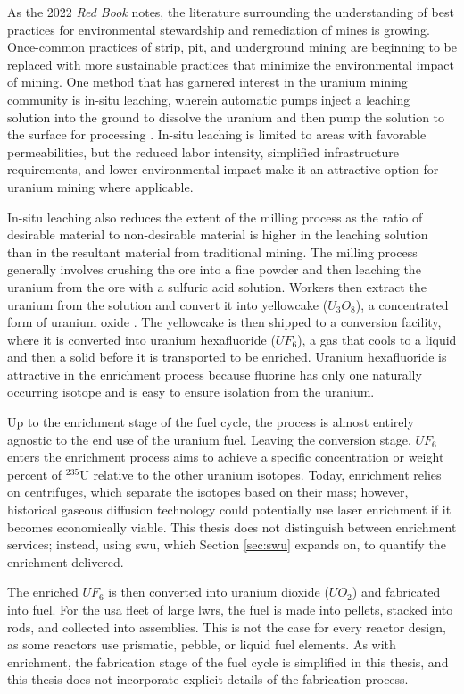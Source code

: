 As the 2022 \textit{Red Book} notes, the literature surrounding the understanding of best practices for environmental stewardship and remediation of mines is growing. Once-common practices of strip, pit, and underground
mining are beginning to be replaced with more sustainable practices that
minimize the environmental impact of mining. One method that has garnered
interest in the uranium mining community is in-situ leaching, wherein automatic pumps inject a leaching solution into the ground to dissolve the uranium and then pump the solution to the surface for processing \cite{insitu_review_2024}. In-situ leaching is limited to areas with favorable permeabilities, but the reduced labor intensity, simplified infrastructure requirements, and lower environmental impact make it an attractive option for uranium mining where applicable.

In-situ leaching also reduces the extent of the milling process as the ratio of
desirable material to non-desirable material is higher in the leaching solution
than in the resultant material from traditional mining. The milling process
generally involves crushing the ore into a fine powder and then leaching the
uranium from the ore with a sulfuric acid solution. Workers then extract the
uranium from the solution and convert it into yellowcake ($U_3O_8$), a
concentrated form of uranium oxide \cite{milling_uranium_2022}. The yellowcake
is then shipped to a conversion facility, where it is converted into uranium
hexafluoride ($UF_6$), a gas that cools to a liquid and then a solid before it
is transported to be enriched. Uranium hexafluoride is attractive in the
enrichment process because fluorine has only one naturally occurring isotope
and is easy to ensure isolation from the uranium.

Up to the enrichment stage of the fuel cycle, the process is almost entirely
agnostic to the end use of the uranium fuel. Leaving the conversion stage,
$UF_6$ enters the enrichment process aims to achieve a specific concentration
or weight percent of $^{235}$U relative to the other uranium isotopes. Today,
enrichment relies on centrifuges, which separate the isotopes based on their
mass; however, historical gaseous diffusion technology could potentially use
laser enrichment if it becomes economically viable. This thesis does not
distinguish between enrichment services; instead, using \gls{swu}, which Section
\ref{sec:swu} expands on, to quantify the enrichment delivered.

The enriched $UF_6$ is then converted into uranium dioxide ($UO_2$) and
fabricated into fuel. For the \gls{usa} fleet of large \glspl{lwr}, the fuel is made into pellets, stacked into rods, and collected into assemblies. This is not the case for every reactor design, as some reactors use prismatic, pebble, or liquid fuel elements. As with enrichment, the fabrication stage of the fuel cycle is simplified in this thesis, and this thesis does not incorporate explicit details of the fabrication process.

